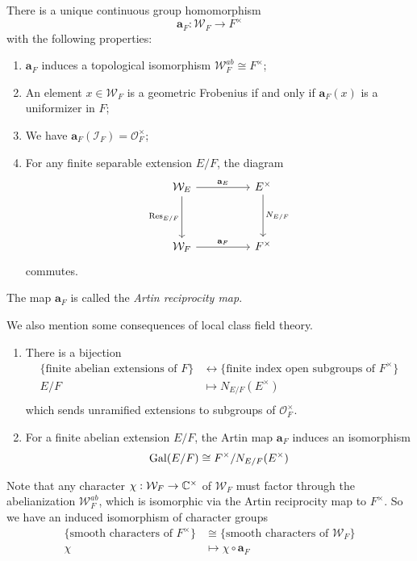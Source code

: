 \begin{thm}
	There is a unique continuous group homomorphism
	\[\mathbf{a}_F: \mathcal{W}_F\to F^\times\]
	with the following properties:
	\begin{enumerate}
		\item $\mathbf{a}_F$ induces a topological isomorphism $\mathcal{W}_F^{ab}\cong F^\times$;
		\item An element $x\in \mathcal{W}_F$ is a geometric Frobenius if and only if $\mathbf{a}_F(x)$ is a uniformizer in $F$;
		\item We have $\mathbf{a}_F(\mathcal{I}_F) = \mathcal{O}_F^\times$;
		\item For any finite separable extension $E/F$, the diagram 
		\[\begin{tikzcd}
			{\mathcal{W}_E} && {E^\times} \\
			\\
			{\mathcal{W}_F} && {F^\times}
			\arrow["{\mathbf{a}_E}", from=1-1, to=1-3]
			\arrow["{\Res_{E/F}}"', from=1-1, to=3-1]
			\arrow["{N_{E/F}}", from=1-3, to=3-3]
			\arrow["{\mathbf{a}_F}", from=3-1, to=3-3]
		\end{tikzcd}\]
		commutes.
	\end{enumerate}
	The map $\mathbf{a}_F$ is called the \emph{Artin reciprocity map}.
\end{thm}
We also mention some consequences of local class field theory.
\begin{cor}
	\begin{enumerate}
	\item There is a bijection
		\begin{align*}
			\{\text{finite abelian extensions of $F$}\} &\leftrightarrow \{\text{finite index open subgroups of $F^\times$}\}\\
				E/F &\mapsto N_{E/F}(E^\times)\\
		\end{align*}
		which sends unramified extensions to subgroups of $\mathcal{O}_F^\times$.
	\item For a finite abelian extension $E/F$, the Artin map $\mathbf{a}_F$ induces an isomorphism
		\[\mathrm{Gal}(E/F)\cong F^\times/N_{E/F}(E^\times)\]
	\end{enumerate}
\end{cor}
Note that any character $\chi: \mathcal{W}_F\to \mathbb{C}^\times$ of $\mathcal{W}_F$ must factor through the abelianization $\mathcal{W}_F^{ab}$, which is isomorphic via the Artin reciprocity map to $F^\times$. So we have an induced isomorphism of character groups
\begin{align*}
	\{\text{smooth characters of }F^\times\} &\cong \{\text{smooth characters of }\mathcal{W}_F\}\\
	\chi &\mapsto \chi\circ\mathbf{a}_F
\end{align*}
